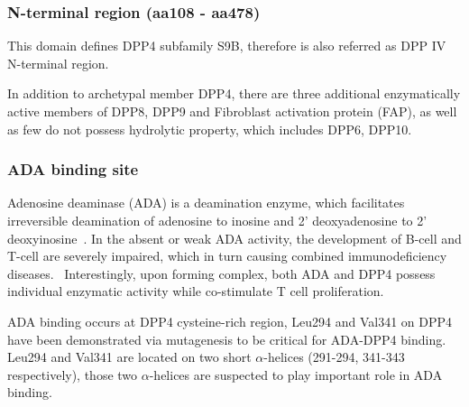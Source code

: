 \subsubsection{N-terminal region (aa108 - aa478)}

This domain defines DPP4 subfamily S9B, therefore is also referred as DPP IV N-terminal region.
\par 
In addition to archetypal member DPP4, there are three additional enzymatically active members of DPP8, DPP9 and Fibroblast activation protein (FAP), as well as few do not possess hydrolytic property, which includes DPP6, DPP10. 

\subsubsection{ADA binding site}
Adenosine deaminase (ADA) is a deamination enzyme, which facilitates irreversible deamination of adenosine to inosine and 2' deoxyadenosine to 2' deoxyinosine~\cite{Franco_1998}. In the absent or weak ADA activity, the development of B-cell and T-cell are severely impaired, which in turn causing combined immunodeficiency diseases.~\cite{Cristalli2001} Interestingly, upon forming complex, both ADA and DPP4 possess individual enzymatic activity while co-stimulate T cell proliferation.~\cite{De_Meester_1999}  
\par 
ADA binding occurs at DPP4 cysteine-rich region,
Leu294 and Val341 on DPP4 have been demonstrated via mutagenesis to be critical for ADA-DPP4 binding.~\cite{Abbott_1999} Leu294 and Val341 are located on two short $\alpha$-helices (291-294, 341-343 respectively), those two $\alpha$-helices are suspected to play important role in ADA binding. 